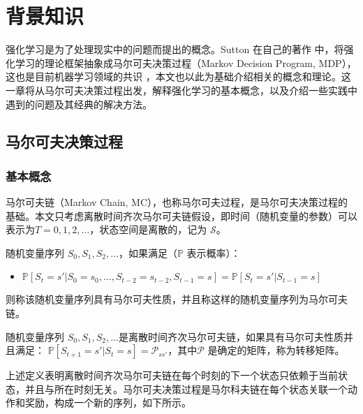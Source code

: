 
\chapter{背景知识}
\label{cha:background-knowledge}


强化学习是为了处理现实中的问题而提出的概念。Sutton 在自己的著作 \cite{suttonReinforcementLearningIntroduction2018}中，将强化学习的理论框架抽象成马尔可夫决策过程（Markov Decision Program, MDP），这也是目前机器学习领域的共识 \cite{mnihHumanlevelControlDeep2015} \cite{mnihAsynchronousMethodsDeep2016} \cite{hesselRainbowCombiningImprovements2018}  ，本文也以此为基础介绍相关的概念和理论。这一章将从马尔可夫决策过程出发，解释强化学习的基本概念，以及介绍一些实践中遇到的问题及其经典的解决方法。

\section{马尔可夫决策过程}
\subsection{基本概念}
马尔可夫链（Markov Chain, MC），也称马尔可夫过程，是马尔可夫决策过程的基础。本文只考虑离散时间齐次马尔可夫链假设，即时间（随机变量的参数）可以表示为$T = {0, 1, 2, \dots}$，状态空间是离散的，记为 $\mathcal{S}$。

\begin{definition}[马尔可夫链]
    随机变量序列 $S_0, S_1, S_2, \dots$，如果满足（$\mathbb{P}$ 表示概率）：
    \begin{itemize}
        \item[] $\mathbb{P} [S_{t} = s' |S_0 = s_0, \dots, S_{t-2} = s_{t-2}, S_{t-1} = s] = \mathbb{P} [S_{t} = s' | S_{t-1} = s]$
    \end{itemize}
    则称该随机变量序列具有马尔可夫性质，并且称这样的随机变量序列为马尔可夫链。
\end{definition}

\begin{definition}[离散时间齐次马尔可夫链]
    随机变量序列 $S_0, S_1, S_2, \dots$是离散时间齐次马尔可夫链，如果具有马尔可夫性质并且满足：
    $\mathbb{P} [S_{t+1} = s' | S_t = s] = \mathcal{P}_{ss'}$，其中$\mathcal{P}$ 是确定的矩阵，称为转移矩阵。
\end{definition}

上述定义表明离散时间齐次马尔可夫链在每个时刻的下一个状态只依赖于当前状态，并且与所在时刻无关。马尔可夫决策过程是马尔科夫链在每个状态关联一个动作和奖励，构成一个新的序列，如下所示。


